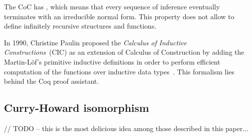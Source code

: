 \documentclass[article]{aaltoseries}
\begin{document}

The CoC has , which means that every sequence of inference eventually terminates with an irreducible normal form. This property does not allow to define infinitely recursive structures and functions. %

%

In 1990, Christine Paulin proposed the \textit{Calculus of Inductive Constructions}~(CIC) as an extension of Calculus of Construction by adding the Martin-Löf's primitive inductive definitions in order to perform efficient computation of the functions over inductive data types~\cite{Pau2015}. This formalism lies behind the Coq proof assistant.



\subsection{Curry-Howard isomorphism}
// TODO -- this is the most delicious idea among those described in this paper...
\end{document}
